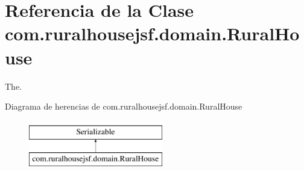 \hypertarget{a00188}{}\section{Referencia de la Clase com.\+ruralhousejsf.\+domain.\+Rural\+House}
\label{a00188}


The.  


Diagrama de herencias de com.\+ruralhousejsf.\+domain.\+Rural\+House\begin{figure}[H]
\begin{center}
\leavevmode
\includegraphics[height=2.000000cm]{a00188}
\end{center}
\end{figure}
